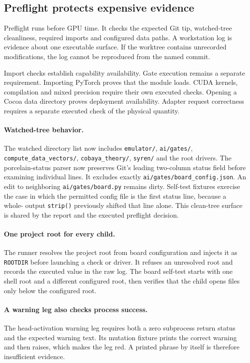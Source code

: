 \documentclass[10pt,aps,prd,twocolumn,nofootinbib]{revtex4-2}
\newcommand{\code}[1]{\texttt{#1}}
\begin{document}
\subsection{Preflight protects expensive evidence}

Preflight runs before GPU time.  It checks the expected Git tip, watched-tree
cleanliness, required imports and configured data paths.  A workstation log
is evidence about one executable surface.  If the worktree contains
unrecorded modifications, the log cannot be reproduced from the named commit.

Import checks establish capability availability.  Gate execution remains a
separate requirement.  Importing PyTorch proves that the module loads.  CUDA
kernels, compilation and mixed precision require their own executed checks.
Opening a Cocoa data directory proves deployment availability.  Adapter
request correctness requires a separate executed check of the physical
quantity.

\paragraph{Watched-tree behavior.}
The watched directory list now includes \code{emulator/}, \code{ai/gates/},
\code{compute\_data\_vectors/}, \code{cobaya\_theory/}, \code{syren/} and the
root drivers.  The porcelain-status parser now preserves Git's leading
two-column status field before examining individual lines.  It excludes
exactly \code{ai/gates/board\_config.json}.  An edit to neighboring
\code{ai/gates/board.py} remains dirty.  Self-test fixtures exercise the case in
which the permitted config file is the first status line, because a whole-
output \code{strip()} previously shifted that line alone.  This clean-tree
surface is shared by the report and the executed preflight decision.

\paragraph{One project root for every child.}
The runner resolves the project root from board configuration and injects it
as \code{ROOTDIR} before launching a check or driver.  It refuses an unresolved
root and records the executed value in the raw log.  The board self-test starts
with one shell root and a different configured root, then verifies that the
child opens files only below the configured root.

\paragraph{A warning leg also checks process success.}
The head-activation warning leg requires both a zero subprocess return status
and the expected warning text.  Its mutation fixture prints the correct
warning and then raises, which makes the leg red.  A printed phrase by itself
is therefore insufficient evidence.
\end{document}
